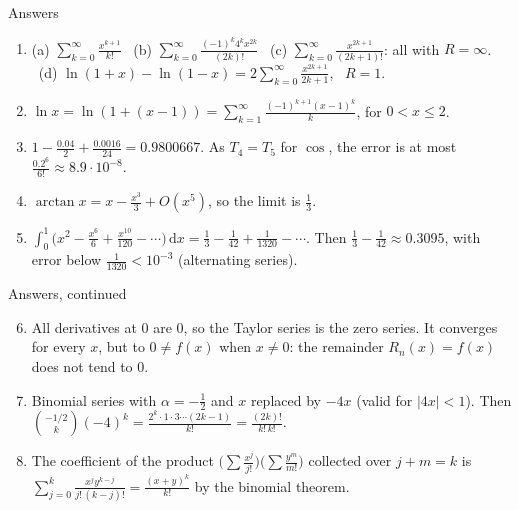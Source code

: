 \documentclass{wosm-slides}
\newcommand{\dx}{\,\mathrm{d}x}
\begin{document}
\begin{frame}{Answers}
  \small
  \begin{enumerate}
    \item (a) $\sum_{k=0}^\infty \frac{x^{k+1}}{k!}$ \
      (b) $\sum_{k=0}^\infty \frac{(-1)^k 4^k x^{2k}}{(2k)!}$ \
      (c) $\sum_{k=0}^\infty \frac{x^{2k+1}}{(2k+1)!}$: all with $R = \infty$. \
      (d) $\ln(1+x) - \ln(1-x) = 2 \sum_{k=0}^\infty \frac{x^{2k+1}}{2k+1}$, \ $R = 1$.
    \item $\ln x = \ln(1 + (x - 1)) = \sum_{k=1}^\infty \frac{(-1)^{k+1}(x-1)^k}{k}$, for $0 < x \le 2$.
    \item $1 - \frac{0.04}{2} + \frac{0.0016}{24} = 0.9800667$. As $T_4 = T_5$ for $\cos$,
      the error is at most $\frac{0.2^6}{6!} \approx 8.9 \cdot 10^{-8}$.
    \item $\arctan x = x - \frac{x^3}{3} + O(x^5)$, so the limit is $\frac13$.
    \item $\int_0^1 \bigl(x^2 - \frac{x^6}{6} + \frac{x^{10}}{120} - \cdots\bigr)\dx
      = \frac13 - \frac{1}{42} + \frac{1}{1320} - \cdots$. Then $\frac13 - \frac1{42} \approx 0.3095$,
      with error below $\frac{1}{1320} < 10^{-3}$ (alternating series).
  \end{enumerate}
\end{frame}

\begin{frame}{Answers, continued}
  \small
  \begin{enumerate}
    \setcounter{enumi}{5}
    \item All derivatives at $0$ are $0$, so the Taylor series is the zero series. It
      converges for every $x$, but to $0 \ne f(x)$ when $x \ne 0$: the remainder
      $R_n(x) = f(x)$ does not tend to $0$.
    \item Binomial series with $\alpha = -\frac12$ and $x$ replaced by $-4x$ (valid for
      $|4x| < 1$). Then $\binom{-1/2}{k}(-4)^k = \frac{2^k \cdot 1 \cdot 3 \cdots (2k-1)}{k!}
      = \frac{(2k)!}{k!\,k!}$.
    \item The coefficient of the product $\bigl(\sum \frac{x^j}{j!}\bigr)\bigl(\sum \frac{y^m}{m!}\bigr)$
      collected over $j + m = k$ is
      $\sum_{j=0}^k \frac{x^j y^{k-j}}{j!\,(k-j)!} = \frac{(x+y)^k}{k!}$ by the binomial theorem.
  \end{enumerate}
\end{frame}
\end{document}
